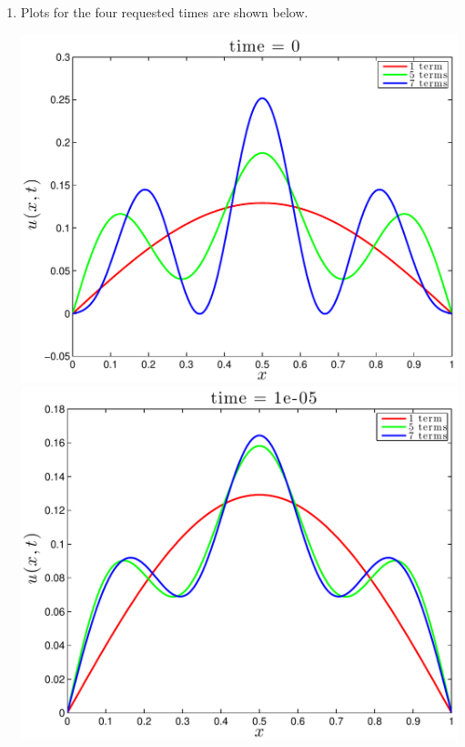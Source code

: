 {\begin{solution}
\begin{enumerate}
\item  Plots for the four requested times are shown below.
\begin{center}
\includegraphics[scale=0.4]{fourth_a}
\includegraphics[scale=0.4]{fourth_b}


\end{center}
\end{enumerate}
\end{solution}}
